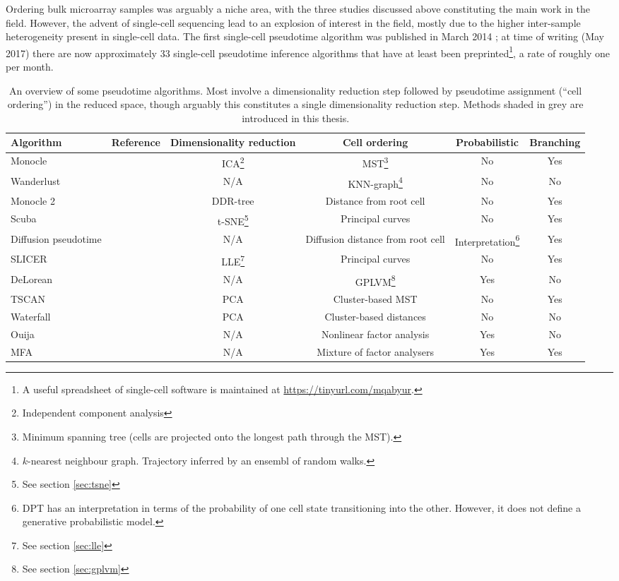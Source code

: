 Ordering bulk microarray samples was arguably a niche area, with the three studies discussed above constituting the main work in the field. However, the advent of single-cell sequencing lead to an explosion of interest in the field, mostly due to the higher inter-sample heterogeneity present in single-cell data. The first single-cell pseudotime algorithm was published in March 2014 \cite{Trapnell2014-xi}; at time of writing (May 2017) there are now approximately 33 single-cell pseudotime inference algorithms that have at least been preprinted\footnote{
A useful spreadsheet of single-cell software is maintained at \url{https://tinyurl.com/mqabyur}.
}, a rate of roughly one per month.

\begin{sidewaystable}
  \centering
\begin{tabular}{|lccccc|}
\hline
Algorithm & Reference & Dimensionality reduction & Cell ordering & Probabilistic & Branching \\
\hline
Monocle & \cite{Trapnell2014-xi} & ICA\footnote{Independent component analysis} &
MST\footnote{Minimum spanning tree (cells are projected onto the longest path through the MST).} & No & Yes \\
Wanderlust & \cite{Bendall2014-rc} & N/A & KNN-graph\footnote{$k$-nearest neighbour graph. Trajectory inferred by an ensembl of random walks.} & No & No \\
Monocle 2 & \cite{Qiu2017-eu} & DDR-tree & Distance from root cell & No & Yes \\
Scuba & \cite{Marco2014-ug} & t-SNE\footnote{See section \ref{sec:tsne}} & Principal curves & No & Yes \\
Diffusion pseudotime & \cite{haghverdi2016diffusion} & N/A & Diffusion distance from root cell &
Interpretation\footnote{DPT has an interpretation in terms of the probability of one cell state transitioning into the other. However, it does not define a generative probabilistic model.} & Yes \\
SLICER & \cite{welch2016slicer} & LLE\footnote{See section \ref{sec:lle}} & Principal curves & No & Yes \\
DeLorean & \cite{Reid2016-yo} & N/A & GPLVM\footnote{See section \ref{sec:gplvm}} & Yes & No \\
TSCAN & \cite{Ji2016-gx} & PCA & Cluster-based MST & No & Yes \\
Waterfall & \cite{Shin2015} & PCA & Cluster-based distances & No & No \\
\rowcolor{Gray}
Ouija & \cite{Campbell2016-ys} & N/A & Nonlinear factor analysis & Yes & No \\
\rowcolor{Gray}
MFA & \cite{campbell2017probabilistic} & N/A & Mixture of factor analysers & Yes & Yes \\
\hline
\end{tabular}
\caption[An overview of some pseudotime algorithms.]{An overview of some pseudotime algorithms. Most involve a dimensionality reduction step followed by pseudotime assignment (``cell ordering'') in the reduced space, though arguably this constitutes a single dimensionality reduction step. Methods shaded in grey are introduced in this thesis.} \label{tbl:pseudotimecomparison}
\end{sidewaystable}

